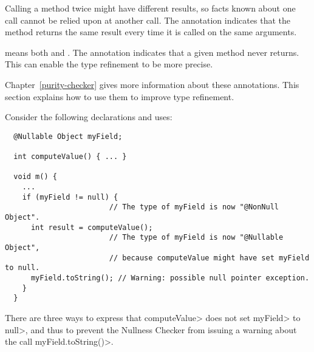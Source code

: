 Calling a method twice might have different results, so facts known about
one call cannot be relied upon at another call.
The  annotation indicates that
the method returns the same result every time it is called on the same
arguments.

 means both
 and
.
The  annotation
indicates that a given method never returns.  This can enable the
type refinement to be more precise.

Chapter~\ref{purity-checker} gives more information about these annotations.
This section explains how to use them to improve type refinement.



Consider the following declarations and uses:

\begin{Verbatim}
  @Nullable Object myField;

  int computeValue() { ... }

  void m() {
    ...
    if (myField != null) {
                        // The type of myField is now "@NonNull Object".
      int result = computeValue();
                        // The type of myField is now "@Nullable Object",
                        // because computeValue might have set myField to null.
      myField.toString(); // Warning: possible null pointer exception.
    }
  }
\end{Verbatim}

There are three ways to express that \<computeValue> does not set
\<myField> to \<null>, and thus to prevent the Nullness Checker from
issuing a warning about the call \<myField.toString()>.

